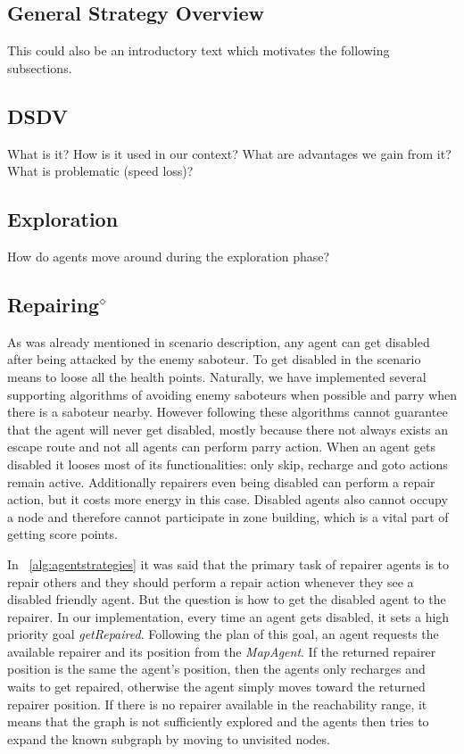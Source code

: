 \subsection{General Strategy Overview}
This could also be an introductory text which motivates the following subsections.


\subsection{DSDV}
What is it? How is it used in our context? What are advantages we gain from it? What is problematic (speed loss)?

\subsection{Exploration}\label{alg:exploration}
How do agents move around during the exploration phase?

\subsection[Repairing]{Repairing$^\diamond$}\label{alg:repairing}
As was already mentioned in scenario description, any agent can get disabled after being attacked by the enemy saboteur. To get disabled in the scenario means to loose all the health points. Naturally, we have implemented several supporting algorithms of avoiding enemy saboteurs when possible and parry when there is a saboteur nearby. However following these algorithms cannot guarantee that the agent will never get disabled, mostly because there not always exists an escape route and not all agents can perform parry action. When an agent gets disabled it looses most of its functionalities: only skip, recharge and goto actions remain active. Additionally repairers even being disabled can perform a repair action, but it costs more energy in this case. Disabled agents also cannot occupy a node and therefore cannot participate in zone building, which is a vital part of getting score points.

In ~\autoref{alg:agentstrategies} it was said that the primary task of repairer agents is to repair others and they should perform a repair action whenever they see a disabled friendly agent. But the question is how to get the disabled agent to the repairer. In our implementation, every time an agent gets disabled, it sets a high priority goal \emph{getRepaired}. Following the plan of this goal, an agent requests the available repairer and its position from the \emph{MapAgent}. If the returned repairer position is the same the agent's position, then the agents only recharges and waits to get repaired, otherwise the agent simply moves toward the returned repairer position. If there is no repairer available in the reachability range, it means that the graph is not sufficiently explored and the agents then tries to expand the known subgraph by moving to unvisited nodes.

